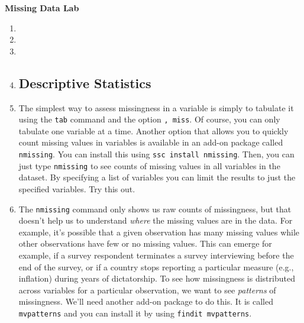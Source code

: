 \documentclass[a4paper,12pt]{article}
\begin{document}
\begin{center}
\textbf{Missing Data Lab}
\end{center}


\begin{enumerate}\itemsep0.5em

\subsection*{The Problem}

\item %
\item %
\item %
\item %

\subsection*{Descriptive Statistics}

\item The simplest way to assess missingness in a variable is simply to tabulate it using the \texttt{tab} command and the option \texttt{, miss}. Of course, you can only tabulate one variable at a time. Another option that allows you to quickly count missing values in variables is available in an add-on package called \texttt{nmissing}. You can install this using \texttt{ssc install nmissing}. Then, you can just type \texttt{nmissing} to see counts of missing values in all variables in the dataset. By specifying a list of variables you can limit the results to just the specified variables. Try this out.


\item The \texttt{nmissing} command only shows us raw counts of missingness, but that doesn't help us to understand {\em where} the missing values are in the data. For example, it's possible that a given observation has many missing values while other observations have few or no missing values. This can emerge for example, if a survey respondent terminates a survey interviewing before the end of the survey, or if a country stops reporting a particular measure (e.g., inflation) during years of dictatorship. To see how missingness is distributed across variables for a particular observation, we want to see {\em patterns} of missingness. We'll need another add-on package to do this. It is called \texttt{mvpatterns} and you can install it by using \texttt{findit mvpatterns}.



\end{enumerate}
\end{document}
